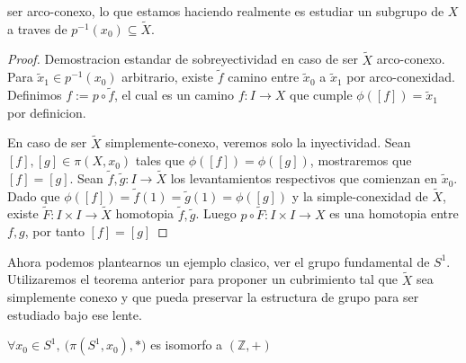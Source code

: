 ser arco-conexo, lo que estamos haciendo realmente es estudiar un
subgrupo de \(X\) a traves de \(p^{-1}(x_0) \subseteq \tilde X\).
\begin{proof}
  Demostracion estandar de sobreyectividad en caso de ser \(\tilde X\)
  arco-conexo. Para \(\tilde x _1 \in p^{-1} (x_0)\) arbitrario, existe
  \(\tilde f\) camino entre \(\tilde x _0 \) a \(\tilde x _1\) por
  arco-conexidad. Definimos \(f := p \circ \tilde f\), el cual es un
  camino \(f : I \to X\) que cumple \(\phi ([f]) = \tilde x _1\) por
  definicion.

  En caso de ser \(\tilde X\) simplemente-conexo, veremos solo la
  inyectividad. Sean \([f],[g] \in \pi (X, x_0)\) tales que \(\phi([f])
  = \phi([g])\), mostraremos que \([f] = [g]\). Sean \(\tilde f, \tilde
  g : I \to \tilde X\) los levantamientos respectivos que comienzan en
  \(\tilde x _0\). Dado que \(\phi([f]) = \tilde f (1) = \tilde g (1) =
  \phi([g])\) y la simple-conexidad de \(\tilde X\), existe \(\tilde F :
  I \times I \to \tilde X\) homotopia \(\tilde f, \tilde g\). Luego \(p
  \circ \tilde F : I \times I \to X \) es una homotopia entre \(f, g\),
  por tanto \([f] = [g]\)
\end{proof}
Ahora podemos plantearnos un ejemplo clasico, ver el grupo fundamental
de \(S^1\). Utilizaremos el teorema anterior para proponer un
cubrimiento tal que \(\tilde X\) sea simplemente conexo y que pueda
preservar la estructura de grupo para ser estudiado bajo ese lente.
\begin{teorema}
  \(\forall x_0 \in S^1,\ \big( \pi (S^1,x_0), * \big)\) es isomorfo a
  \((\mathbb Z, +)\)
\end{teorema}
